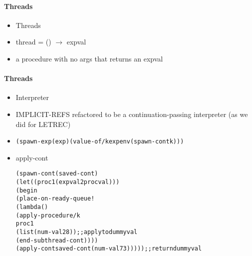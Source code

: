 \documentclass{beamer}
\newcommand{\arrow}{\(\rightarrow\)}
\begin{document}
\begin{frame}[fragile]
\framesubtitle{Threads}
\begin{scriptsize}
\begin{itemize}
\item<1-> Threads

\item<1-> thread = () \arrow{} expval

\item<1-> a procedure with no args that returns an expval

\end{itemize}
\end{scriptsize}
\end{frame}

\begin{frame}[fragile]
\framesubtitle{Threads}
\begin{scriptsize}
\begin{itemize}
\item<1-> Interpreter

\item<1-> IMPLICIT-REFS refactored to be a continuation-passing interpreter (as we did for LETREC)

\item<1-> 
\begin{alltt}
(spawn-exp (exp) (value-of/k exp env (spawn-cont k)))
\end{alltt}

\item<2-> apply-cont
\begin{alltt}
(spawn-cont (saved-cont)
  (let ((proc1 (expval2proc val)))
   (begin
    (place-on-ready-queue!
      (lambda ()
       (apply-procedure/k 
        proc1
        (list (num-val 28)) ;; apply to dummy val
        (end-subthread-cont))))
    (apply-cont saved-cont (num-val 73))))) ;; return dummy val
\end{alltt}

\end{itemize}
\end{scriptsize}
\end{frame}
\end{document}
